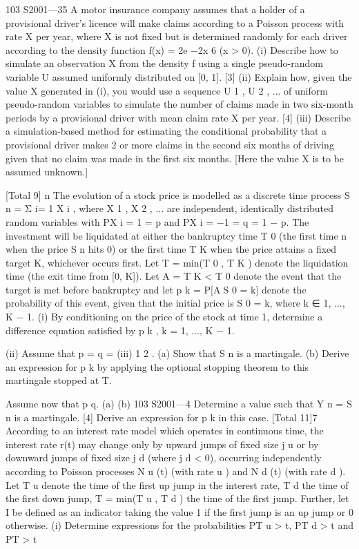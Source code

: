 \documentclass[a4paper,12pt]{article}
\begin{document}
\begin{enumerate} 103 S2001—35
A motor insurance company assumes that a holder of a provisional driver’s
licence will make claims according to a Poisson process with rate X per year,
where X is not fixed but is determined randomly for each driver according to the
density function
f(x) = 2e −2x
6
(x > 0).
(i) Describe how to simulate an observation X from the density f using a
single pseudo-random variable U assumed uniformly distributed on [0, 1].
[3]
(ii) Explain how, given the value X generated in (i), you would use a sequence
U 1 , U 2 , ... of uniform pseudo-random variables to simulate the number of
claims made in two six-month periods by a provisional driver with mean
claim rate X per year.
[4]
(iii) Describe a simulation-based method for estimating the conditional
probability that a provisional driver makes 2 or more claims in the second
six months of driving given that no claim was made in the first six
months. [Here the value X is to be assumed unknown.]

[Total 9]
n
The evolution of a stock price is modelled as a discrete time process S n = Σ i=
1 X i ,
where X 1 , X 2 , ... are independent, identically distributed random variables with
P{X i = 1} = p and P{X i = −1} = q = 1 − p. The investment will be liquidated at
either the bankruptcy time T 0 (the first time n when the price S n hits 0) or the
first time T K when the price attains a fixed target K, whichever occurs first.
Let T = min(T 0 , T K ) denote the liquidation time (the exit time from [0, K]). Let
A = {T K < T 0 } denote the event that the target is met before bankruptcy and let
p k = P[AS 0 = k] denote the probability of this event, given that the initial price is
S 0 = k, where k ∈ {1, ..., K − 1}.
(i) By conditioning on the price of the stock at time 1, determine a difference
equation satisfied by p k , k = 1, ..., K − 1.

(ii) Assume that p = q =
(iii)
1
2
.
(a) Show that S n is a martingale.
(b) Derive an expression for p k by applying the optional stopping
theorem to this martingale stopped at T.

Assume now that p \neq q.
(a)
(b)
103 S2001—4
Determine a value \theta {} such that Y n = \theta S n is a martingale.
[4]
Derive an expression for p k in this case.
[Total 11]7
According to an interest rate model which operates in continuous time, the
interest rate r(t) may change only by upward jumps of fixed size j u or by
downward jumps of fixed size j d (where j d < 0), occurring independently according
to Poisson processes N u (t) (with rate \lambda u ) and N d (t) (with rate \lambda d ).
Let T u denote the time of the first up jump in the interest rate, T d the time of the
first down jump, T = min(T u , T d ) the time of the first jump. Further, let I be
defined as an indicator taking the value 1 if the first jump is an up jump or 0
otherwise.
(i) Determine expressions for the probabilities P{T u > t}, P{T d > t} and P{T > t}


\end{enumerate}
\end{document}
